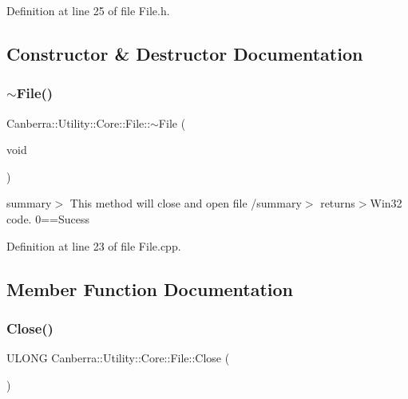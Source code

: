 Definition at line 25 of file File.\+h.



\subsection{Constructor \& Destructor Documentation}
\mbox{\label{class_canberra_1_1_utility_1_1_core_1_1_file_ab66aba37064f0601fe750fd4b395085c_ab66aba37064f0601fe750fd4b395085c}} 
\subsubsection{\texorpdfstring{$\sim$\+File()}{~File()}}
{\footnotesize\ttfamily Canberra\+::\+Utility\+::\+Core\+::\+File\+::$\sim$\+File (\begin{DoxyParamCaption}\item[{void}]{ }\end{DoxyParamCaption})\hspace{0.3cm}{\ttfamily [virtual]}}

summary$>$ This method will close and open file /summary$>$ returns$>$Win32 code. 0==Sucess

Definition at line 23 of file File.\+cpp.



\subsection{Member Function Documentation}
\mbox{\label{class_canberra_1_1_utility_1_1_core_1_1_file_aa421329224af00499fe56cd5cfacd70a_aa421329224af00499fe56cd5cfacd70a}} 
\subsubsection{\texorpdfstring{Close()}{Close()}}
{\footnotesize\ttfamily U\+L\+O\+NG Canberra\+::\+Utility\+::\+Core\+::\+File\+::\+Close (\begin{DoxyParamCaption}{ }\end{DoxyParamCaption})}

